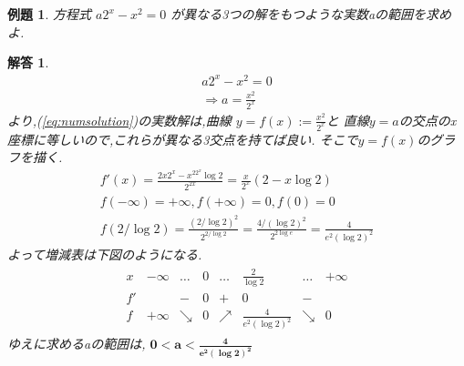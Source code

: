 \documentclass[a4paper,11pt,twocolumn]{jsbook}
\newtheorem{example}{例題}[section]
\newtheorem*{solution}{解答}
\begin{document}
\begin{screen}
  \begin{example}
    方程式 $a 2^x - x^2 = 0$ が異なる3つの解をもつような実数aの範囲を求めよ.
  \end{example}
\end{screen}
\begin{solution}
  \begin{eqnarray}
    a 2^x - x^2 = 0 \label{eq:numsolution}\\
    \Rightarrow a = \frac{x^2}{2^x} \nonumber
  \end{eqnarray}
  より,(\ref{eq:numsolution})の実数解は,曲線 $y=f(x):=\frac{x^2}{2^x}$と
  直線$y=a$の交点のx座標に等しいので,これらが異なる3交点を持てば良い.
  そこで$y=f(x)$のグラフを描く.
  \begin{eqnarray*}
    f'(x) = \frac{2x2^x - x^22^x\log 2}{2^{2x}} = \frac{x}{2^x}(2-x\log 2)\\
    f(-\infty)=+\infty, 
    f(+\infty)=0, 
    f(0)=0\\
    f(2/\log 2) = \frac{(2/\log2)^2}{2^{2/\log2}} = \frac{4/(\log2)^2}{2^{2\log e}} 
    = \frac{4}{e^2 (\log2)^2}
  \end{eqnarray*}
  よって増減表は下図のようになる.
  \begin{eqnarray*}
    \begin{array}{c|ccccccc}
      x&-\infty&\dots&0&\dots&\frac{2}{\log2}&\dots&+\infty\\
      f'&&-&0&+&0&-&\\
      f&+\infty&\searrow&0&\nearrow&\frac{4}{e^2(\log2)^2}&\searrow&0
    \end{array}
  \end{eqnarray*}
  ゆえに求めるaの範囲は,
  $\bm{0<a<\frac{4}{e^2(\log2)^2}}$
\end{solution}
\end{document}
